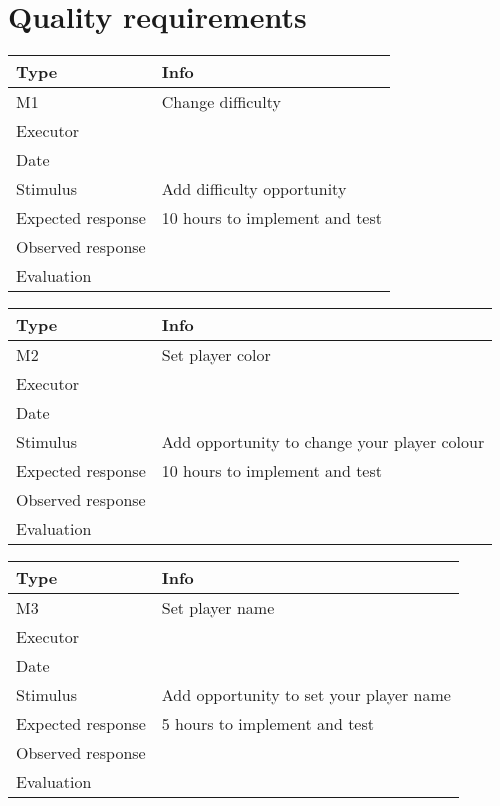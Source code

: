 \vspace{0.5em}

\section{Quality requirements}
\noindent
\begin{tabular}{|p{2cm}|p{10cm}|}
	\hline
	\bf{Type}	& \bf{Info} \\
	\hline
	M1			& Change difficulty \\
	Executor	&  \\
	Date		& \date{\today} \\
	Stimulus	& Add difficulty opportunity \\
	Expected response & 10 hours to implement and test \\
	Observed response & \\
	Evaluation	& \\
	\hline
\end{tabular}

\vspace{0.5em}

\noindent
\begin{tabular}{|p{2cm}|p{10cm}|}
	\hline
	\bf{Type}	& \bf{Info} \\
	\hline
	M2			& Set player color \\
	Executor	&  \\
	Date		& \date{\today} \\
	Stimulus	& Add opportunity to change your player colour \\
	Expected response & 10 hours to implement and test\\
	Observed response & \\
	Evaluation	& \\
	\hline
\end{tabular}

\vspace{0.5em}

\noindent
\begin{tabular}{|p{2cm}|p{10cm}|}
	\hline
	\bf{Type}	& \bf{Info} \\
	\hline
	M3			& Set player name \\
	Executor	&  \\
	Date		& \date{\today} \\
	Stimulus	& Add opportunity to set your player name \\
	Expected response & 5 hours to implement and test\\
	Observed response & \\
	Evaluation	&  \\
	\hline
\end{tabular}

